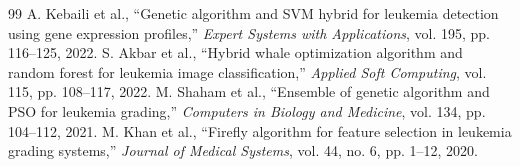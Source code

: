 \documentclass[12pt, a4paper]{article}
\begin{document}
\begin{thebibliography}{99}
A. Kebaili et al., ``Genetic algorithm and SVM hybrid for leukemia detection using gene expression profiles,'' \emph{Expert Systems with Applications}, vol. 195, pp. 116--125, 2022.
S. Akbar et al., ``Hybrid whale optimization algorithm and random forest for leukemia image classification,'' \emph{Applied Soft Computing}, vol. 115, pp. 108--117, 2022.
M. Shaham et al., ``Ensemble of genetic algorithm and PSO for leukemia grading,'' \emph{Computers in Biology and Medicine}, vol. 134, pp. 104--112, 2021.
M. Khan et al., ``Firefly algorithm for feature selection in leukemia grading systems,'' \emph{Journal of Medical Systems}, vol. 44, no. 6, pp. 1--12, 2020.
\end{thebibliography}
\end{document}
